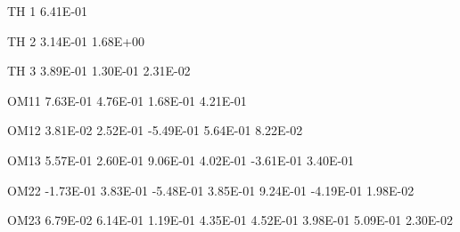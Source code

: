 \documentclass[
  11pt,
  krantz2, a4paper, twoside]{krantz}
\newenvironment{Shaded}{\begin{snugshade}}{\end{snugshade}}
\newcommand{\DecValTok}[1]{\textcolor[rgb]{0.00,0.00,0.81}{#1}}
\newcommand{\FloatTok}[1]{\textcolor[rgb]{0.00,0.00,0.81}{#1}}
\newcommand{\NormalTok}[1]{#1}
\theoremstyle{definition}
\theoremstyle{definition}
\theoremstyle{definition}
\theoremstyle{remark}
\begin{document}
\begin{Shaded}
\begin{Highlighting}[]
                                                                                                       
\NormalTok{TH }\DecValTok{1}    \FloatTok{6.41E{-}01}                                                                                       
                                                                                                       
\NormalTok{TH }\DecValTok{2}    \FloatTok{3.14E{-}01}  \FloatTok{1.68E+00}                                                                             
                                                                                                       
\NormalTok{TH }\DecValTok{3}    \FloatTok{3.89E{-}01}  \FloatTok{1.30E{-}01}  \FloatTok{2.31E{-}02}                                                                   
                                                                                                       
\NormalTok{OM11    }\FloatTok{7.63E{-}01}  \FloatTok{4.76E{-}01}  \FloatTok{1.68E{-}01}  \FloatTok{4.21E{-}01}                                                         
                                                                                                       
\NormalTok{OM12    }\FloatTok{3.81E{-}02}  \FloatTok{2.52E{-}01} \FloatTok{{-}5.49E{-}01}  \FloatTok{5.64E{-}01}  \FloatTok{8.22E{-}02}                                               
                                                                                                       
\NormalTok{OM13    }\FloatTok{5.57E{-}01}  \FloatTok{2.60E{-}01}  \FloatTok{9.06E{-}01}  \FloatTok{4.02E{-}01} \FloatTok{{-}3.61E{-}01}  \FloatTok{3.40E{-}01}                                     
                                                                                                       
\NormalTok{OM22   }\FloatTok{{-}1.73E{-}01}  \FloatTok{3.83E{-}01} \FloatTok{{-}5.48E{-}01}  \FloatTok{3.85E{-}01}  \FloatTok{9.24E{-}01} \FloatTok{{-}4.19E{-}01}  \FloatTok{1.98E{-}02}                           
                                                                                                       
\NormalTok{OM23    }\FloatTok{6.79E{-}02}  \FloatTok{6.14E{-}01}  \FloatTok{1.19E{-}01}  \FloatTok{4.35E{-}01}  \FloatTok{4.52E{-}01}  \FloatTok{3.98E{-}01}  \FloatTok{5.09E{-}01}  \FloatTok{2.30E{-}02}                 
                                                                                                       

\end{Highlighting}
\end{Shaded}
\end{document}

